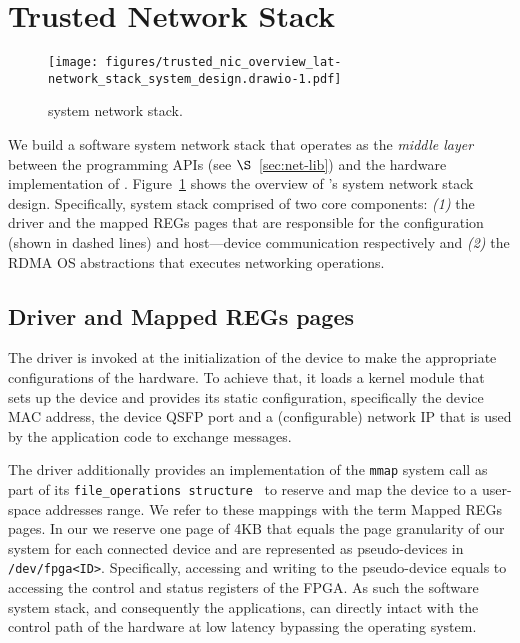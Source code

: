 \section{Trusted Network Stack}
\label{sec:t-nic-network}


\begin{figure}[t!]
    \centering
    \texttt{[image: figures/trusted\_nic\_overview\_lat-network\_stack\_system\_design.drawio-1.pdf]}
    \caption{\projecttitle{} system network stack.}
    \label{fig:network_stack_design}
\end{figure}


We build a software \projecttitle{} system network stack that operates as the {\em middle layer} between the \projecttitle{} programming APIs (see $\S$~\ref{sec:net-lib}) and the hardware implementation of \projecttitle{}. Figure~\ref{fig:network_stack_design} shows the overview of \projecttitle{}'s system network stack design. Specifically, \projecttitle{} system stack comprised of two core components: {\em (1)} the \projecttitle{} driver and the mapped REGs pages that are responsible for the configuration (shown in dashed lines) and host---device communication respectively and {\em (2)} the RDMA OS abstractions that executes networking operations. 

\subsection{\projecttitle{} Driver and Mapped REGs pages} 

The \projecttitle{} driver is invoked at the initialization of the device to make the appropriate configurations of the \projecttitle{} hardware.  To achieve that, it loads a kernel module that sets up the device and provides its static configuration, specifically the device MAC address, the device QSFP port and a (configurable) network IP that is used by the application code to exchange messages. 

The driver additionally provides an implementation of the {\tt mmap} system call as part of its {\tt file\_operations structure}~\cite{device_drivers} to reserve and map the device to a user-space addresses range. We refer to these mappings with the term Mapped REGs pages. In our \projecttitle{} we reserve one page of 4KB that equals the page granularity of our system for each connected device and are represented as pseudo-devices in {\tt /dev/fpga<ID>}. Specifically, accessing and writing to the pseudo-device equals to accessing the control and status registers of the FPGA. As such the software system stack, and consequently the applications, can directly intact with the control path of the \projecttitle{} hardware at low latency bypassing the operating system. 

